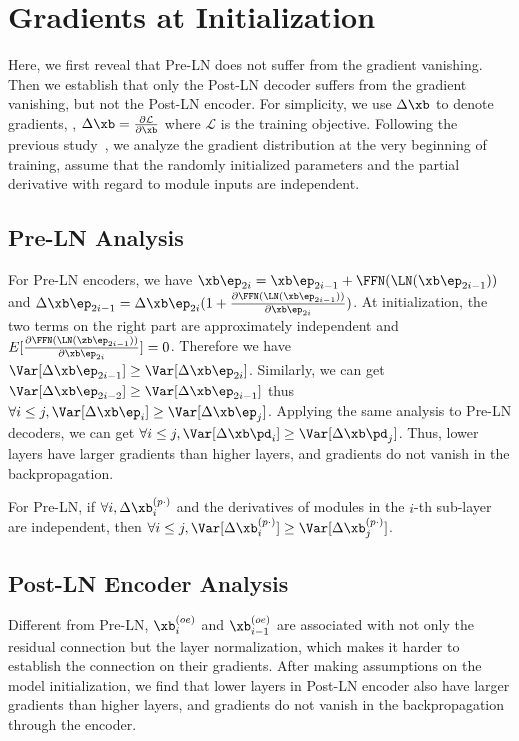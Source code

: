 \appendixpage

\setcounter{theorem}{0}    


\section{Gradients at Initialization}
\label{appendix:ini_grad}

Here, we first reveal that Pre-LN does not suffer from the gradient vanishing. 
Then we establish that only the Post-LN decoder suffers from the gradient vanishing, but not the Post-LN encoder. 
For simplicity, we use $\Delta \xb$ to denote gradients, \ie, $\Delta \xb = \frac{\partial \mathcal{L}}{\partial \xb}$ where $\mathcal{L}$ is the training objective. 
Following the previous study~\cite{Bengio1994LearningLD,Glorot2010UnderstandingTD,He2015DelvingDI,saxe2013exact}, we analyze the gradient distribution at the very beginning of training, assume that the randomly initialized parameters and the partial derivative with regard to module inputs are independent.


\subsection{Pre-LN Analysis}
\label{subsec:preln-analysis}
For Pre-LN encoders, we have 
$ \xb\ep_{2i} = \xb\ep_{2i-1} + \FFN(\LN(\xb\ep_{2i-1}))$ and
$ \Delta\xb\ep_{2i-1} = \Delta\xb\ep_{2i} (1 + \frac{\partial \FFN(\LN(\xb\ep_{2i-1})) }{\partial \xb\ep_{2i}})$. 
At initialization, the two terms on the right part are approximately independent and $E[\frac{\partial \FFN(\LN(\zb\ep_{2i-1})) }{\partial \xb\ep_{2i}}] = 0$. Therefore we have $ \Var[\Delta\xb\ep_{2i-1}] \geq \Var[\Delta\xb\ep_{2i}]$.
Similarly, we can get $ \Var[\Delta\xb\ep_{2i-2}] \geq \Var[\Delta\xb\ep_{2i-1}]$ thus $\forall i \leq j, \Var[\Delta\xb\ep_{i}] \geq \Var[\Delta\xb\ep_{j}]$. 
Applying the same analysis to Pre-LN decoders, we can get $\forall i \leq j, \Var[\Delta\xb\pd_{i}] \geq \Var[\Delta\xb\pd_{j}]$.
Thus, lower layers have larger gradients than higher layers, and gradients do not vanish in the backpropagation. 
\begin{remark}
For Pre-LN, if $\forall i, \Delta \xb_i^{(p\cdot)}$ and the derivatives of modules in the $i$-th sub-layer are independent, then $\forall i \leq j, \Var[\Delta \xb^{(p\cdot)}_{i}] \geq \Var[\Delta \xb^{(p\cdot)}_{j}]$.
\label{remark: pre-ln-gradient}
\end{remark}


\subsection{Post-LN Encoder Analysis}
\label{subsec:postln-encoder-analysis}
Different from Pre-LN, $\xb_{i}^{(oe)}$ and $\xb_{i-1}^{(oe)}$ are associated with not only the residual connection but the layer normalization, which makes it harder to establish the connection on their gradients.
After making assumptions on the model initialization, we find that lower layers in Post-LN encoder also have larger gradients than higher layers, and gradients do not vanish in the backpropagation through the encoder.   


